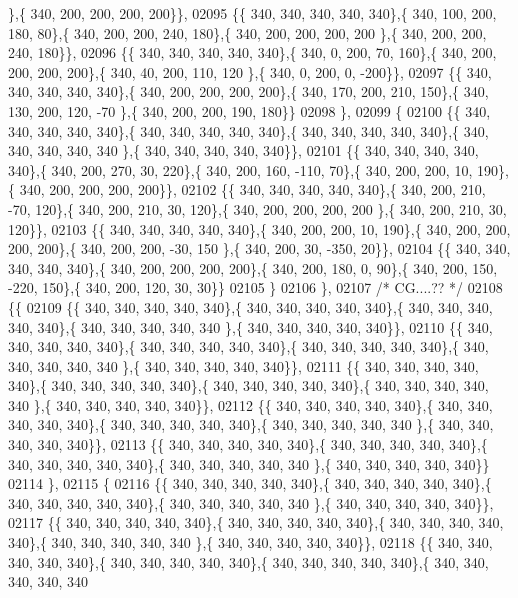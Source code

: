 \begin{DoxyCode}
      \},\{ 340, 200, 200, 200, 200\}\},
02095 \{\{ 340, 340, 340, 340, 340\},\{ 340, 100, 200, 180,  80\},\{ 340, 200, 200, 240, 180\},\{ 340, 200, 200, 200, 200
      \},\{ 340, 200, 200, 240, 180\}\},
02096 \{\{ 340, 340, 340, 340, 340\},\{ 340,   0, 200,  70, 160\},\{ 340, 200, 200, 200, 200\},\{ 340,  40, 200, 110, 120
      \},\{ 340,   0, 200,   0, -200\}\},
02097 \{\{ 340, 340, 340, 340, 340\},\{ 340, 200, 200, 200, 200\},\{ 340, 170, 200, 210, 150\},\{ 340, 130, 200, 120, -70
      \},\{ 340, 200, 200, 190, 180\}\}
02098 \},
02099 \{
02100 \{\{ 340, 340, 340, 340, 340\},\{ 340, 340, 340, 340, 340\},\{ 340, 340, 340, 340, 340\},\{ 340, 340, 340, 340, 340
      \},\{ 340, 340, 340, 340, 340\}\},
02101 \{\{ 340, 340, 340, 340, 340\},\{ 340, 200, 270,  30, 220\},\{ 340, 200, 160, -110,  70\},\{ 340, 200, 200,  10, 
      190\},\{ 340, 200, 200, 200, 200\}\},
02102 \{\{ 340, 340, 340, 340, 340\},\{ 340, 200, 210, -70, 120\},\{ 340, 200, 210,  30, 120\},\{ 340, 200, 200, 200, 200
      \},\{ 340, 200, 210,  30, 120\}\},
02103 \{\{ 340, 340, 340, 340, 340\},\{ 340, 200, 200,  10, 190\},\{ 340, 200, 200, 200, 200\},\{ 340, 200, 200, -30, 150
      \},\{ 340, 200,  30, -350,  20\}\},
02104 \{\{ 340, 340, 340, 340, 340\},\{ 340, 200, 200, 200, 200\},\{ 340, 200, 180,   0,  90\},\{ 340, 200, 150, -220, 
      150\},\{ 340, 200, 120,  30,  30\}\}
02105 \}
02106 \},
02107 \textcolor{comment}{/* CG....?? */}
02108 \{\{
02109 \{\{ 340, 340, 340, 340, 340\},\{ 340, 340, 340, 340, 340\},\{ 340, 340, 340, 340, 340\},\{ 340, 340, 340, 340, 340
      \},\{ 340, 340, 340, 340, 340\}\},
02110 \{\{ 340, 340, 340, 340, 340\},\{ 340, 340, 340, 340, 340\},\{ 340, 340, 340, 340, 340\},\{ 340, 340, 340, 340, 340
      \},\{ 340, 340, 340, 340, 340\}\},
02111 \{\{ 340, 340, 340, 340, 340\},\{ 340, 340, 340, 340, 340\},\{ 340, 340, 340, 340, 340\},\{ 340, 340, 340, 340, 340
      \},\{ 340, 340, 340, 340, 340\}\},
02112 \{\{ 340, 340, 340, 340, 340\},\{ 340, 340, 340, 340, 340\},\{ 340, 340, 340, 340, 340\},\{ 340, 340, 340, 340, 340
      \},\{ 340, 340, 340, 340, 340\}\},
02113 \{\{ 340, 340, 340, 340, 340\},\{ 340, 340, 340, 340, 340\},\{ 340, 340, 340, 340, 340\},\{ 340, 340, 340, 340, 340
      \},\{ 340, 340, 340, 340, 340\}\}
02114 \},
02115 \{
02116 \{\{ 340, 340, 340, 340, 340\},\{ 340, 340, 340, 340, 340\},\{ 340, 340, 340, 340, 340\},\{ 340, 340, 340, 340, 340
      \},\{ 340, 340, 340, 340, 340\}\},
02117 \{\{ 340, 340, 340, 340, 340\},\{ 340, 340, 340, 340, 340\},\{ 340, 340, 340, 340, 340\},\{ 340, 340, 340, 340, 340
      \},\{ 340, 340, 340, 340, 340\}\},
02118 \{\{ 340, 340, 340, 340, 340\},\{ 340, 340, 340, 340, 340\},\{ 340, 340, 340, 340, 340\},\{ 340, 340, 340, 340, 340

\end{DoxyCode}
